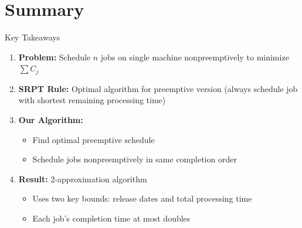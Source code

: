 \documentclass[aspectratio=169, 12pt]{beamer}
\begin{document}
\section{Summary}

\begin{frame}{Key Takeaways}
    \begin{enumerate}
        \item<1-> \textbf{Problem:} Schedule $n$ jobs on single machine nonpreemptively to minimize $\sum C_j$
        
        \vspace{0.3cm}
        \item<2-> \textbf{SRPT Rule:} Optimal algorithm for preemptive version (always schedule job with shortest remaining processing time)
        
        \vspace{0.3cm}
        \item<3-> \textbf{Our Algorithm:}
        \begin{itemize}
            \item Find optimal preemptive schedule
            \item Schedule jobs nonpreemptively in same completion order
        \end{itemize}
        
        \vspace{0.3cm}
        \item<4-> \textbf{Result:} 2-approximation algorithm
        \begin{itemize}
            \item Uses two key bounds: release dates and total processing time
            \item Each job's completion time at most doubles
        \end{itemize}
    \end{enumerate}
\end{frame}
\end{document}
